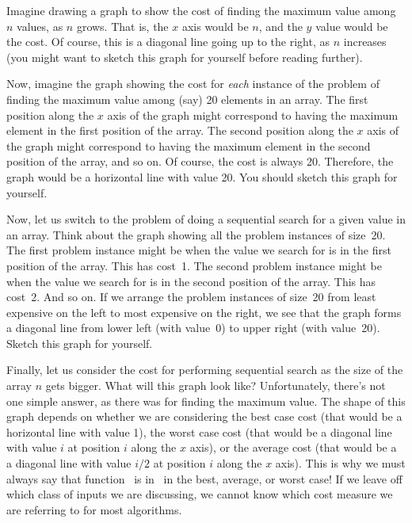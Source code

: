 \begin{example}
Imagine drawing a graph to show the cost of finding the maximum value
among \(n\) values, as \(n\) grows.
That is, the \(x\) axis would be \(n\), and the \(y\) value would be
the cost.
Of course, this is a diagonal line going up to the right, as \(n\)
increases (you might want to sketch this graph for yourself before
reading further).

Now, imagine the graph showing the cost for \emph{each} instance of
the problem of finding the maximum value among (say) 20 elements in an
array.
The first position along the \(x\) axis of the graph might correspond
to having the maximum element in the first position of the array.
The second position along the \(x\) axis of the graph might correspond
to having the maximum element in the second position of the array, and
so on.
Of course, the cost is always 20.
Therefore, the graph would be a horizontal line with value 20.
You should sketch this graph for yourself.

Now, let us switch to the problem of doing a sequential search for a
given value in an array.
Think about the graph showing all the problem instances of size~20.
The first problem instance might be when the value we search for is in
the first position of the array.
This has cost~1.
The second problem instance might be when the value we search for is in
the second position of the array.
This has cost~2.
And so on.
If we arrange the problem instances of size~20 from least expensive on
the left to most expensive on the right, we see that the graph forms a
diagonal line from lower left (with value~0) to upper right (with
value~20).
Sketch this graph for yourself.

Finally, let us consider the cost for performing sequential search as
the size of the array \(n\) gets bigger.
What will this graph look like?
Unfortunately, there's not one simple answer, as there was for finding
the maximum value.
The shape of this graph depends on whether we are considering the best
case cost (that would be a horizontal line with value 1), the worst
case cost (that would be a diagonal line with value \(i\) at position
\(i\) along the \(x\) axis), or the average cost (that would be a a
diagonal line with value \(i/2\) at position \(i\) along the \(x\)
axis).
This is why we must always say that function \fn\ is in \Ogn\ in the
best, average, or worst case!
If we leave off which class of inputs we are discussing, we cannot
know which cost measure we are referring to for most algorithms.
\end{example}

